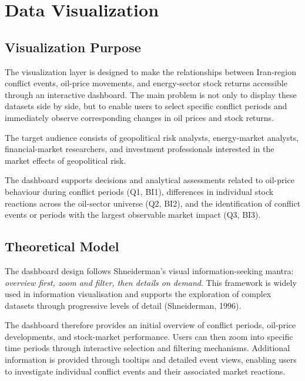 \documentclass[11pt,a4paper]{article}
\begin{document}
\newpage

\section{Data Visualization}

\subsection{Visualization Purpose}
\label{sec:viz_purpose}

The visualization layer is designed to make the relationships between
Iran-region conflict events, oil-price movements, and energy-sector
stock returns accessible through an interactive dashboard. The main
problem is not only to display these datasets side by side, but to
enable users to select specific conflict periods and immediately
observe corresponding changes in oil prices and stock returns.

The target audience consists of geopolitical risk analysts,
energy-market analysts, financial-market researchers, and investment
professionals interested in the market effects of geopolitical risk.

The dashboard supports decisions and analytical assessments related to
oil-price behaviour during conflict periods (Q1, BI1), differences in
individual stock reactions across the oil-sector universe (Q2, BI2),
and the identification of conflict events or periods with the largest
observable market impact (Q3, BI3).

\subsection{Theoretical Model}
\label{sec:theoretical_model}

The dashboard design follows Shneiderman's visual information-seeking
mantra: \emph{overview first, zoom and filter, then details on
demand}. This framework is widely used in information visualisation
and supports the exploration of complex datasets through progressive
levels of detail (Shneiderman, 1996).

The dashboard therefore provides an initial overview of conflict
periods, oil-price developments, and stock-market performance. Users
can then zoom into specific time periods through interactive
selection and filtering mechanisms. Additional information is provided
through tooltips and detailed event views, enabling users to
investigate individual conflict events and their associated market
reactions.
\end{document}
